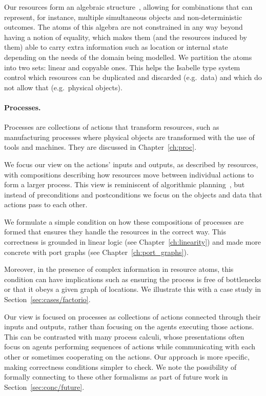 \documentclass[class=smolathesis,crop=false]{standalone}
\begin{document}
Our resources form an algebraic structure~\cite{baader_nipkow-1998-ch03}, allowing for combinations that can represent, for instance, multiple simultaneous objects and non-deterministic outcomes.
The atoms of this algebra are not constrained in any way beyond having a notion of equality, which makes them (and the resources induced by them) able to carry extra information such as location or internal state depending on the needs of the domain being modelled.
We partition the atoms into two sets: linear and copyable ones.
This helps the Isabelle type system control which resources can be duplicated and discarded (e.g.\ data) and which do not allow that (e.g.\ physical objects).

\paragraph*{Processes.}
Processes are collections of actions that transform resources, such as manufacturing processes where physical objects are transformed with the use of tools and machines.
They are discussed in Chapter~\ref{ch:proc}.

We focus our view on the actions' inputs and outputs, as described by resources, with compositions describing how resources move between individual actions to form a larger process.
This view is reminiscent of algorithmic planning~\cite{russell_norvig-2013}, but instead of preconditions and postconditions we focus on the objects and data that actions pass to each other.

We formulate a simple condition on how these compositions of processes are formed that ensures they handle the resources in the correct way.
This correctness is grounded in linear logic (see Chapter~\ref{ch:linearity}) and made more concrete with port graphs (see Chapter~\ref{ch:port_graphs}).

Moreover, in the presence of complex information in resource atoms, this condition can have implications such as ensuring the process is free of bottlenecks or that it obeys a given graph of locations.
We illustrate this with a case study in Section~\ref{sec:cases/factorio}.

Our view is focused on processes as collections of actions connected through their inputs and outputs, rather than focusing on the agents executing those actions.
This can be contrasted with many process calculi, whose presentations often focus on agents performing sequences of actions while communicating with each other or sometimes cooperating on the actions.
Our approach is more specific, making correctness conditions simpler to check.
We note the possibility of formally connecting to these other formalisms as part of future work in Section~\ref{sec:conc/future}.
\end{document}
